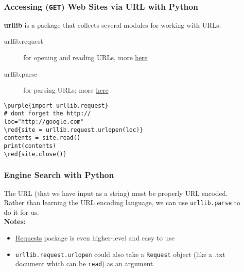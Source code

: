 \documentclass[xcolor=svgnames]{beamer}
\newcommand{\red}[1]{\textcolor{red}{#1}}
\newcommand{\purple}[1]{{\textcolor{purple}{#1}}}
\newcommand{\nl}{\\[1em]}
\newcommand{\ft}[1]{\frametitle{#1}}
\begin{document}
\begin{frame}[fragile]\ft{Accessing ({\tt GET}) Web Sites via URL with Python}
{\bf urllib} is a package that collects several modules for working with URLs: 
\begin{description}
\item[urllib.request] for opening and reading URLs, more \href{https://docs.python.org/3/library/urllib.request.html#module-urllib.request}{here}
\item[urllib.parse] for parsing URLs; more  \href{https://docs.python.org/3/library/urllib.parse.html#module-urllib.parse}{here}
\end{description}

\begin{Verbatim}[xleftmargin=.1in,commandchars=\\\{\}]
\purple{import urllib.request}
# dont forget the http://
loc="http://google.com"
\red{site = urllib.request.urlopen(loc)}
contents = site.read()
print(contents)
\red{site.close()}
\end{Verbatim}
\end{frame}
  

\begin{frame}[fragile]\ft{Engine Search with Python }

The URL (that we have input as a string) must be properly URL encoded.\nl 
Rather than learning the URL encoding language, we can use {\tt urllib.parse} to do it for us.\nl%

{\bf Notes:}
\begin{itemize}
\item \href{https://requests.readthedocs.org/en/master/}{Requests} package is even higher-level and easy to use\nl
\item {\tt urllib.request.urlopen} could also take a {\tt Request} object (like a .txt document which can be {\tt read}) as an argument.\nl
\end{itemize}
\end{frame}
\end{document}
